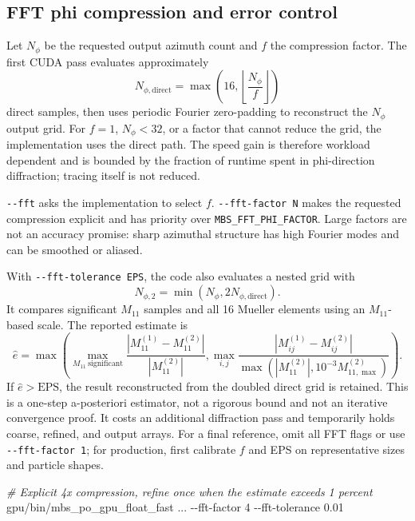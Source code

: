 \documentclass[
  10pt,
  a4paper,
]{article}
\newenvironment{Shaded}{}{}
\newcommand{\AttributeTok}[1]{\textcolor[rgb]{0.49,0.56,0.16}{#1}}
\newcommand{\CommentTok}[1]{\textcolor[rgb]{0.38,0.63,0.69}{\textit{#1}}}
\newcommand{\ExtensionTok}[1]{#1}
\newcommand{\NormalTok}[1]{#1}
\begin{document}
\subsection{FFT phi compression and error control}

Let $N_\phi$ be the requested output azimuth count and $f$ the compression
factor. The first CUDA pass evaluates approximately
\[
 N_{\phi,\mathrm{direct}}
 =\max\!\left(16,\left\lfloor\frac{N_\phi}{f}\right\rfloor\right)
\]
direct samples, then uses periodic Fourier zero-padding to reconstruct the
$N_\phi$ output grid. For $f=1$, $N_\phi<32$, or a factor that cannot
reduce the grid, the implementation uses the direct path. The speed gain is
therefore workload dependent and is bounded by the fraction of runtime spent
in phi-direction diffraction; tracing itself is not reduced.

\texttt{-\/-fft} asks the implementation to select $f$.
\texttt{-\/-fft-factor N} makes the requested compression explicit and has
priority over \texttt{MBS\_FFT\_PHI\_FACTOR}. Large factors are not an accuracy
promise: sharp azimuthal structure has high Fourier modes and can be smoothed
or aliased.

With \texttt{-\/-fft-tolerance EPS}, the code also evaluates a nested grid
with
\[
 N_{\phi,2}=\min(N_\phi,2N_{\phi,\mathrm{direct}}).
\]
It compares significant $M_{11}$ samples and all 16 Mueller elements using
an $M_{11}$-based scale. The reported estimate is
\[
 \widehat e=\max\!\left(
   \max_{M_{11}\ \mathrm{significant}}
     \frac{|M_{11}^{(1)}-M_{11}^{(2)}|}{|M_{11}^{(2)}|},
   \max_{i,j}\frac{|M_{ij}^{(1)}-M_{ij}^{(2)}|}
     {\max(|M_{11}^{(2)}|,10^{-3}M_{11,\max}^{(2)})}
 \right).
\]
If $\widehat e>\mathrm{EPS}$, the result reconstructed from the doubled direct grid
is retained. This is a one-step a-posteriori estimator, not a rigorous bound
and not an iterative convergence proof. It costs an additional diffraction
pass and temporarily holds coarse, refined, and output arrays. For a final
reference, omit all FFT flags or use \texttt{-\/-fft-factor 1}; for production,
first calibrate $f$ and EPS on representative sizes and particle shapes.

\begin{Shaded}
\begin{Highlighting}[]
\CommentTok{\# Explicit 4x compression, refine once when the estimate exceeds 1 percent}
\ExtensionTok{gpu/bin/mbs\_po\_gpu\_float\_fast}\NormalTok{ ... }\AttributeTok{{-}{-}fft-factor}\NormalTok{ 4 }\AttributeTok{{-}{-}fft-tolerance}\NormalTok{ 0.01}
\end{Highlighting}
\end{Shaded}
\end{document}
